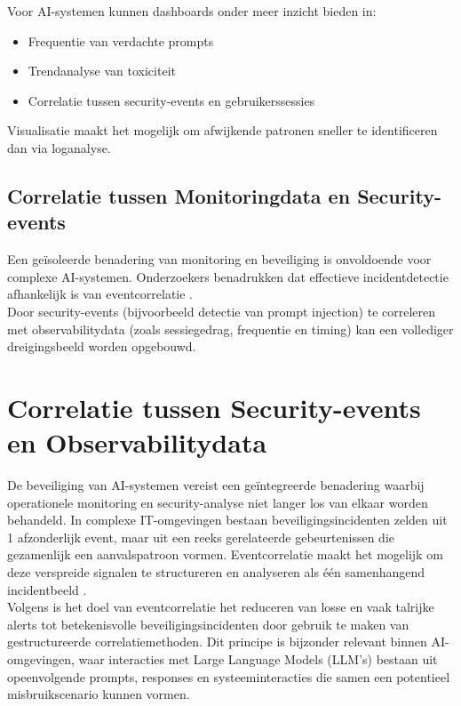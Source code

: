 Voor AI-systemen kunnen dashboards onder meer inzicht bieden in:

\begin{itemize}
    \item Frequentie van verdachte prompts
    \item Trendanalyse van toxiciteit
    \item Correlatie tussen security-events en gebruikerssessies
\end{itemize}

Visualisatie maakt het mogelijk om afwijkende patronen sneller te identificeren dan via loganalyse.

\subsection{Correlatie tussen Monitoringdata en Security-events}

Een geïsoleerde benadering van monitoring en beveiliging is onvoldoende voor complexe AI-systemen. Onderzoekers benadrukken dat effectieve incidentdetectie afhankelijk is van eventcorrelatie \autocite{chandola2009anomaly}.\\

Door security-events (bijvoorbeeld detectie van prompt injection) te correleren met observabilitydata (zoals sessiegedrag, frequentie en timing) kan een vollediger dreigingsbeeld worden opgebouwd.\\






\section{Correlatie tussen Security-events en Observabilitydata}

De beveiliging van AI-systemen vereist een geïntegreerde benadering waarbij operationele monitoring en security-analyse niet langer los van elkaar worden behandeld. In complexe IT-omgevingen bestaan beveiligingsincidenten zelden uit 1 afzonderlijk event, maar uit een reeks gerelateerde gebeurtenissen die gezamenlijk een aanvalspatroon vormen. Eventcorrelatie maakt het mogelijk om deze verspreide signalen te structureren en analyseren als één samenhangend incidentbeeld \autocite{kotenko2022securityCorrelation}.\\

Volgens \textcite{kotenko2022securityCorrelation} is het doel van eventcorrelatie het reduceren van losse en vaak talrijke alerts tot betekenisvolle beveiligingsincidenten door gebruik te maken van gestructureerde correlatiemethoden. Dit principe is bijzonder relevant binnen AI-omgevingen, waar interacties met Large Language Models (LLM’s) bestaan uit opeenvolgende prompts, responses en systeeminteracties die samen een potentieel misbruikscenario kunnen vormen.


